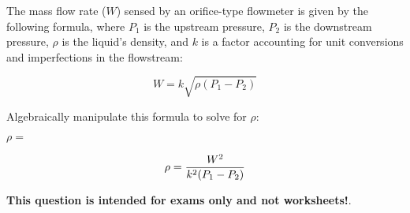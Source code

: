 

The mass flow rate ($W$) sensed by an orifice-type flowmeter is given by the following formula, where $P_1$ is the upstream pressure, $P_2$ is the downstream pressure, $\rho$ is the liquid's density, and $k$ is a factor accounting for unit conversions and imperfections in the flowstream:
 
$$W = k \sqrt{\rho (P_1 - P_2)}$$

Algebraically manipulate this formula to solve for $\rho$:

\vskip 20pt

$\rho = $







$$\rho = {W^2 \over k^2 (P_1 - P_2)}$$







{\bf This question is intended for exams only and not worksheets!}.



